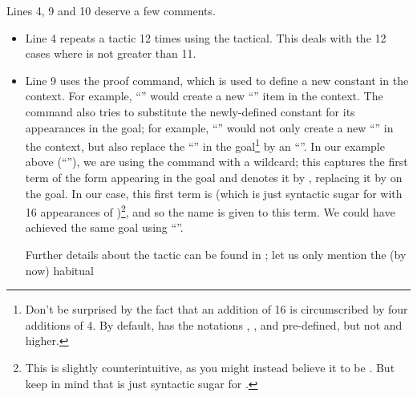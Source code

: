 

Lines 4, 9 and 10 deserve a few comments.
\begin{itemize}
\item Line 4 repeats a tactic 12 times using the  tactical.
This deals with the 12 cases where  is not greater than 11.
\item Line 9 uses the  proof command, which is used to define a new
constant in the context. For example, ``'' would
create a new ``'' item in the context. The
command also tries to substitute the newly-defined constant for its
appearances in the goal; for example, ``'' would not
only create a new ``'' in the context, but also
replace the ``'' in the goal\footnote{Don't be
surprised by the fact that an addition of 16 is circumscribed by four
additions of 4. By default, \mcbMC{} has the notations ,
,  and  pre-defined, but not  and higher.}
by an ``''. In our example above
(``''), we are using the
 command with a wildcard; this captures the first term of the
form  appearing in the goal and denotes it by , replacing
it by  on the goal. In our case, this first term is
 (which is just syntactic sugar for
 with 16 appearances of )\footnote{This is
slightly counterintuitive, as you
might instead believe it to be . But keep in mind
that  is just syntactic sugar for
.},
and so the name  is given to this term. We could have achieved
the same goal using ``''.
\par
Further details about the  tactic can be found in
\cite[\S 4.2]{ssrman}; let us only mention the (by now) habitual

\end{itemize}

